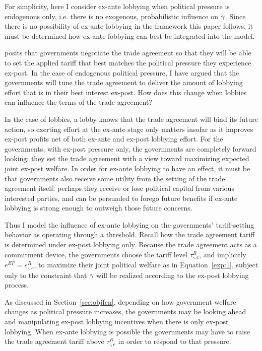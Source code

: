 For simplicity, here I consider ex-ante lobbying when political pressure is endogenous only, i.e. there is no exogenous, probabilistic influence on $\gamma$. Since there is no possibility of ex-ante lobbying in the \Textcite{bs2005} framework this paper follows, it must be determined how ex-ante lobbying can best be integrated into the model.

\Textcite{bs2005} posits that governments negotiate the trade agreement so that they will be able to set the applied tariff that best matches the political pressure they experience ex-post. In the case of endogenous political pressure, I have argued that the governments will tune the trade agreement to deliver the amount of lobbying effort that is in their best interest ex-post. How does this change when lobbies can influence the terms of the trade agreement?

In the case of lobbies, a lobby knows that the trade agreement will bind its future action, so exerting effort at the ex-ante stage only matters insofar as it improves ex-post profits net of both ex-ante and ex-post lobbying effort. For the governments, with ex-post pressure only, the governments are completely forward looking: they set the trade agreement with a view toward maximizing expected joint ex-post welfare. In order for ex-ante lobbying to have an effect, it must be that governments also receive some utility from the setting of the trade agreement itself: perhaps they receive or lose political capital from various interested parties, and can be persuaded to forego future benefits if ex-ante lobbying is strong enough to outweigh those future concerns. 

Thus I model the influence of ex-ante lobbying on the governments' tariff-setting behavior as operating through a threshold. Recall how the trade agreement tariff is determined under ex-post lobbying only. Because the trade agreement acts as a commitment device, the governments choose the tariff level $\tau^R_{\cdot,e}$, and implicitly $e^{EP}=e^R_{\cdot,e}$, to maximize their joint political welfare as in Equation~\ref{exp:1}, subject only to the constraint that $\gamma$ will be realized according to the ex-post lobbying process.
		
As discussed in Section~\ref{sec:objfcn}, depending on how government welfare changes as political pressure increases, the governments may be looking ahead and manipulating ex-post lobbying incentives when there is only ex-post lobbying. When ex-ante lobbying is possible the governments may have to raise the trade agreement tariff above $\tau^R_{\cdot,e}$ in order to respond to that pressure.

